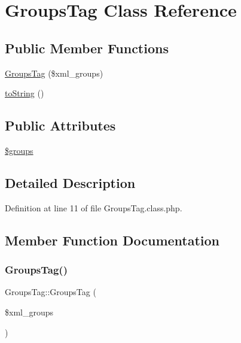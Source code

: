 \hypertarget{classGroupsTag}{}\section{Groups\+Tag Class Reference}
\label{classGroupsTag}
\subsection*{Public Member Functions}
\begin{DoxyCompactItemize}
\item 
\hyperlink{classGroupsTag_a6e715e4a1666d864895755c14ce94980}{Groups\+Tag} (\$xml\+\_\+groups)
\item 
\hyperlink{classGroupsTag_ac4937c3dbca6a6b765dad56c1a3e2bc4}{to\+String} ()
\end{DoxyCompactItemize}
\subsection*{Public Attributes}
\begin{DoxyCompactItemize}
\item 
\hyperlink{classGroupsTag_a9453af2df0470874f09d6b948c32f5c6}{\$groups}
\end{DoxyCompactItemize}


\subsection{Detailed Description}


Definition at line 11 of file Groups\+Tag.\+class.\+php.



\subsection{Member Function Documentation}
\mbox{\label{classGroupsTag_a6e715e4a1666d864895755c14ce94980}} 
\subsubsection{\texorpdfstring{Groups\+Tag()}{GroupsTag()}}
{\footnotesize\ttfamily Groups\+Tag\+::\+Groups\+Tag (\begin{DoxyParamCaption}\item[{}]{\$xml\+\_\+groups }\end{DoxyParamCaption})}


